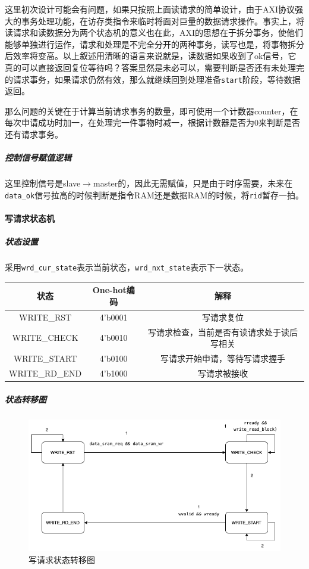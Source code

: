 \documentclass[UTF-8,twoside,c5size]{ctexart}
\begin{document}
	这里初次设计可能会有问题，如果只按照上面读请求的简单设计，由于AXI协议强大的事务处理功能，在访存类指令来临时将面对巨量的数据请求操作。事实上，将读请求和读数据分为两个状态机的意义也在此，AXI的思想在于拆分事务，使他们能够单独进行运作，请求和处理是不完全分开的两种事务，读写也是，将事物拆分后效率将变高。以上叙述用清晰的语言来说就是，读数据如果收到了ok信号，它真的可以直接返回复位等待吗？答案显然是未必可以，需要判断是否还有未处理完的请求事务，如果请求仍然有效，那么就继续回到处理准备\texttt{start}阶段，等待数据返回。
	
	那么问题的关键在于计算当前请求事务的数量，即可使用一个计数器counter，在每次申请成功时加一，在处理完一件事物时减一，根据计数器是否为0来判断是否还有请求事务。
	
	\subparagraph{控制信号赋值逻辑}\hfill
	
	这里控制信号是slave$\rightarrow$master的，因此无需赋值，只是由于时序需要，未来在\texttt{data_ok}信号拉高的时候判断是指令RAM还是数据RAM的时候，将\texttt{rid}暂存一拍。
	
	\paragraph{写请求状态机}\hfill
	
	\subparagraph{状态设置}\hfill
	
	采用\texttt{wrd_cur_state}表示当前状态，\texttt{wrd_nxt_state}表示下一状态。
	
	\begin{center}
	\begin{tabular}{|c|c|c|}
	\hline
  	\textbf{状态} & \textbf{One-hot编码} & \textbf{解释} \\
  	\hline
	WRITE_RST & 4'b0001 & 写请求复位 \\
	\hline
	WRITE_CHECK & 4'b0010 & 写请求检查，当前是否有读请求处于读后写相关 \\
	\hline
	WRITE_START & 4'b0100 & 写请求开始申请，等待写请求握手 \\
	\hline
	WRITE_RD_END & 4'b1000 & 写请求被接收 \\
	\hline
	\end{tabular}
	\end{center}
	
	\subparagraph{状态转移图}\hfill
	
	\begin{figure}[h]
		\centering
		\includegraphics[width=0.75\linewidth]{figures/WRD.png}
		\caption[rreq_status]{写请求状态转移图}
		\label{fig:rreq_status}
	\end{figure}
	
\end{document}
